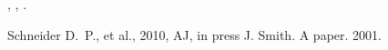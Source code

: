 \documentclass{mn2e}
\begin{document}
\cite{s10}, \citet{a}, \citep{a}.
\begin{thebibliography}{}
 Schneider D.~P., et al., 2010, AJ, in press
 J. Smith. A paper. 2001.
\end{thebibliography}
\end{document}
